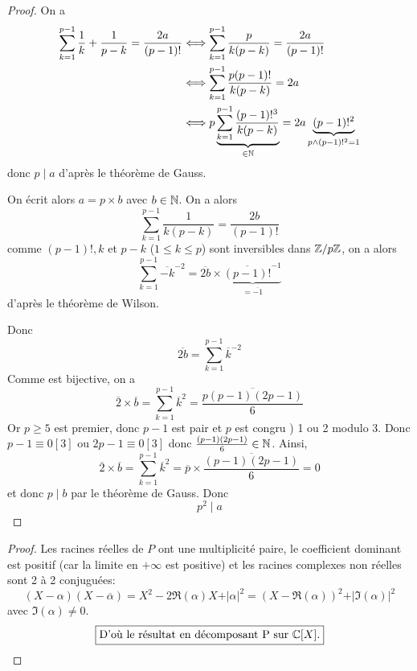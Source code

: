 \documentclass[12pt]{article}
\begin{document}
\begin{proof}
	On a 
	\begin{align}
		\sum_{k=1}^{p-1}\frac{1}{k}+\frac{1}{p-k}=\frac{2a}{(p-1)!}
		&\Longleftrightarrow \sum_{k=1}^{p-1}\frac{p}{k(p-k)}=\frac{2a}{(p-1)!}\\
		&\Longleftrightarrow \sum_{k=1}^{p-1}\frac{p(p-1)!}{k(p-k)}=2a\\
		&\Longleftrightarrow p\underbrace{\sum_{k=1}^{p-1}\frac{(p-1)!^{3}}{k(p-k)}}_{\in\mathbb{N}}=2a\underbrace{(p-1)!^{2}}_{p\wedge (p-1)!^{2}=1}
	\end{align}
	donc $p\mid a$ d'après le théorème de Gauss.

	On écrit alors $a=p\times b$ avec $b\in\mathbb{N}$. On a alors
	\begin{equation}
		\sum_{k=1}^{p-1}\frac{1}{k(p-k)}=\frac{2b}{(p-1)!}
	\end{equation}
	comme $(p-1)!,k$ et $p-k$ ($1\leqslant k\leqslant p$) sont inversibles dans $\mathbb{Z}/p\mathbb{Z}$, on a alors
	\begin{equation}
		\sum_{k=1}^{p-1}\overline{-k}^{-2}=\overline{2b}\times\underbrace{\overline{(p-1)!}^{-1}}_{=\overline{-1}}
	\end{equation}
	d'après le théorème de Wilson.

	Donc 
	\begin{equation}
		\overline{2b}=\sum_{k=1}^{p-1}\overline{k}^{-2}
	\end{equation}
	Comme 
	est bijective, on a 
	\begin{equation}
		\overline{2}\times\overline{b}=\sum_{k=1}^{p-1}\overline{k}^{2}=\overline{\frac{p(p-1)(2p-1)}{6}}
	\end{equation}
	Or $p\geqslant5$ est premier, donc $p-1$ est pair et $p$ est congru ) 1 ou 2 modulo 3. Donc $p-1\equiv0[3]$ ou $2p-1\equiv0[3]$ donc $\frac{(p-1)(2p-1)}{6}\in\mathbb{N}$. Ainsi, 
	\begin{equation}
		\overline{2}\times\overline{b}=\sum_{k=1}^{p-1}\overline{k}^{2}=\overline{p}\times\overline{\frac{(p-1)(2p-1)}{6}}=0
	\end{equation}
	et donc $p\mid b$ par le théorème de Gauss. Donc 
	\begin{equation}
		\boxed{p^{2}\mid a}
	\end{equation}
\end{proof}

\begin{proof}
	Les racines réelles de $P$ ont une multiplicité paire, le coefficient dominant est positif (car la limite en $+\infty$ est positive) et les racines complexes non réelles sont 2 à 2 conjuguées:
	\begin{equation}
		(X-\alpha)(X-\overline{\alpha})=X^{2}-2\Re(\alpha)X+\vert\alpha\vert^{2}=(X-\Re(\alpha))^{2}+\vert\Im(\alpha)\vert^{2}
	\end{equation}
	avec $\Im(\alpha)\neq0$.
	\begin{equation}
		\boxed{\text{D'où le résultat en décomposant P sur }\mathbb{C}[X].}
	\end{equation}
\end{proof}
\end{document}
